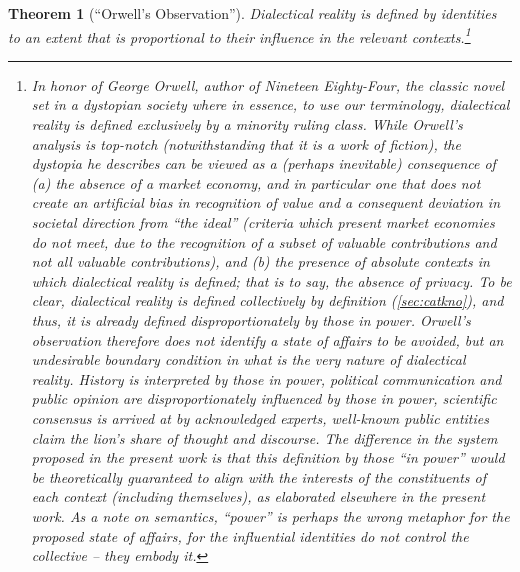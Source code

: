 \documentclass[pra,twocolumn,groupedaddress,10pt]{revtex4}
\newtheorem{theorem}{Theorem}[section]
\theoremstyle{definition}
\begin{document}
\begin{theorem}[``Orwell's Observation'']
	Dialectical reality is defined by identities to an extent that is proportional to their influence in the relevant contexts.\footnote{In honor of George Orwell, author of \emph{Nineteen Eighty-Four}\cite{orwell}, the classic novel set in a dystopian society where in essence, to use our terminology, dialectical reality is defined exclusively by a minority ruling class. While Orwell's analysis is top-notch (notwithstanding that it is a work of fiction), the dystopia he describes can be viewed as a (perhaps inevitable) consequence of (a) the absence of a market economy, and in particular one that does not create an artificial bias in recognition of value and a consequent deviation in societal direction from ``the ideal'' (criteria which present market economies do not meet, due to the recognition of a subset of valuable contributions and not all valuable contributions), and (b) the presence of absolute contexts in which dialectical reality is defined; that is to say, the absence of privacy. To be clear, dialectical reality is defined collectively \emph{by definition} (\autoref{sec:catkno}), and thus, it is \emph{already} defined disproportionately by those in power. Orwell's observation therefore does not identify a state of affairs to be avoided, but an undesirable boundary condition in what is the very nature of dialectical reality. History is interpreted by those in power, political communication and public opinion are disproportionately influenced by those in power, scientific consensus is arrived at by acknowledged experts, well-known public entities claim the lion's share of thought and discourse. The difference in the system proposed in the present work is that this definition by those ``in power'' would be theoretically guaranteed to align with the interests of the constituents of each context (including themselves), as elaborated elsewhere in the present work. As a note on semantics, ``power'' is perhaps the wrong metaphor for the proposed state of affairs, for the influential identities do not control the collective -- they \emph{embody} it.}
\end{theorem}
\end{document}
